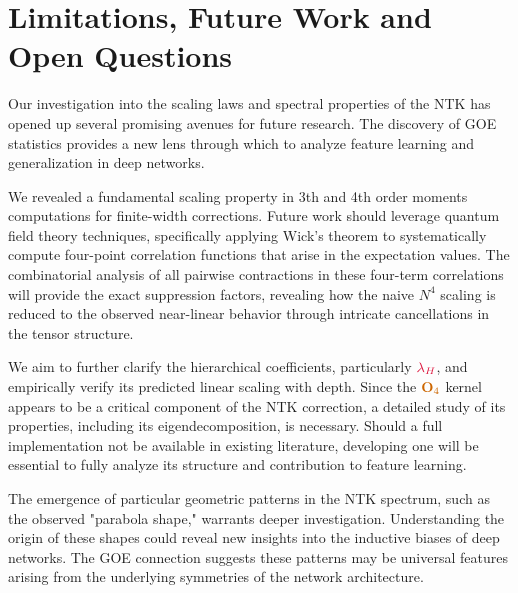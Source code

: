 \documentclass[a4paper]{article}
\theoremstyle{plain}
\theoremstyle{definition}
\theoremstyle{remark}
\begin{document}
\newpage
\section{Limitations, Future Work and Open Questions}

Our investigation into the scaling laws and spectral properties of the NTK has opened up several promising avenues for future research. The discovery of GOE statistics provides a new lens through which to analyze feature learning and generalization in deep networks.

\begin{tcolorbox}[colback=red!5,colframe=red!40!black,title={\textbf{Critical Open Question: The Scaling Puzzle}},enhanced,drop shadow]
We revealed a fundamental scaling property in 3th and 4th order moments computations for finite-width corrections. Future work should leverage quantum field theory techniques, specifically applying Wick's theorem to systematically compute four-point correlation functions that arise in the expectation values. The combinatorial analysis of all pairwise contractions in these four-term correlations will provide the exact suppression factors, revealing how the naive $N^4$ scaling is reduced to the observed near-linear behavior through intricate cancellations in the tensor structure.
\end{tcolorbox}

\begin{tcolorbox}[colback=blue!5,colframe=blue!40!black,title={\textbf{Neural Tangent Hierarchy Dynamics}},enhanced,drop shadow]
We aim to further clarify the hierarchical coefficients, particularly $\textcolor{kernelcolor}{\lambda_H}$, and empirically verify its predicted linear scaling with depth. Since the $\textcolor{orange!80!black}{\mathbf{O}_4}$ kernel appears to be a critical component of the NTK correction, a detailed study of its properties, including its eigendecomposition, is necessary. Should a full implementation not be available in existing literature, developing one will be essential to fully analyze its structure and contribution to feature learning.
\end{tcolorbox}

\begin{tcolorbox}[colback=purple!5,colframe=purple!40!black,title={\textbf{Geometric Structure in NTK Spectra}},enhanced,drop shadow]
The emergence of particular geometric patterns in the NTK spectrum, such as the observed "parabola shape," warrants deeper investigation. Understanding the origin of these shapes could reveal new insights into the inductive biases of deep networks. The GOE connection suggests these patterns may be universal features arising from the underlying symmetries of the network architecture.
\end{tcolorbox}
\end{document}
